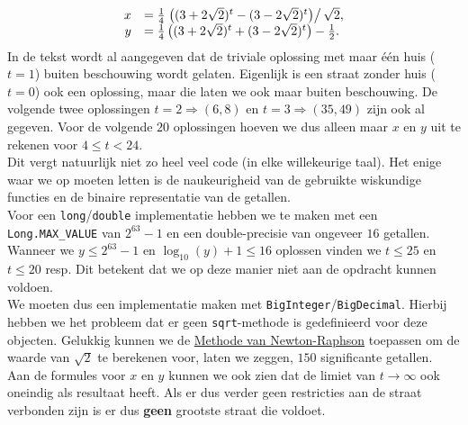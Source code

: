 \documentclass[11pt, a4paper]{article}
\begin{document}
$$\begin{array}{rl}
x&=\frac{1}{4}\left.\left((3+2\sqrt{2})^t-(3-2\sqrt{2})^t\right)\right/\sqrt{2},\\
y&=\frac{1}{4}\left((3+2\sqrt{2})^t+(3-2\sqrt{2})^t\right)-\frac{1}{2}.
\end{array}$$
In de tekst wordt al aangegeven dat de triviale oplossing met maar \'{e}\'{e}n huis ($t=1$) buiten beschouwing wordt gelaten. Eigenlijk is een straat zonder huis ($t=0$) ook een oplossing, maar die laten we ook maar buiten beschouwing. De volgende twee oplossingen $t=2\Rightarrow(6, 8)$ en $t=3\Rightarrow(35, 49)$ zijn ook al gegeven. Voor de volgende $20$ oplossingen hoeven we dus alleen maar $x$ en $y$ uit te rekenen voor $4\leq t<24$.\\
Dit vergt natuurlijk niet zo heel veel code (in elke willekeurige taal). Het enige waar we op moeten letten is de naukeurigheid van de gebruikte wiskundige functies en de binaire representatie van de getallen.\\
Voor een \texttt{long}/\texttt{double} implementatie hebben we te maken met een \texttt{Long.MAX\_VALUE} van $2^{63}-1$ en een double-precisie van ongeveer $16$ getallen. Wanneer we ${y\leq2^{63}-1}$ en ${\log_{10}(y)+1\leq16}$ oplossen vinden we $t\leq25$ en $t\leq20$ resp. Dit betekent dat we op deze manier niet aan de opdracht kunnen voldoen.\\
We moeten dus een implementatie maken met \texttt{BigInteger}/\texttt{BigDecimal}. Hierbij hebben we het probleem dat er geen \texttt{sqrt}-methode is gedefinieerd voor deze objecten. Gelukkig kunnen we de \href{http://nl.wikipedia.org/wiki/Methode_van_Newton-Raphson}{Methode van Newton-Raphson} toepassen om de waarde van $\sqrt{2}$ te berekenen voor, laten we zeggen, $150$ significante getallen.\\[11pt]
Aan de formules voor $x$ en $y$ kunnen we ook zien dat de limiet van $t\to\infty$ ook oneindig als resultaat heeft. Als er dus verder geen restricties aan de straat verbonden zijn is er dus \textbf{geen} grootste straat die voldoet.
\end{document}
